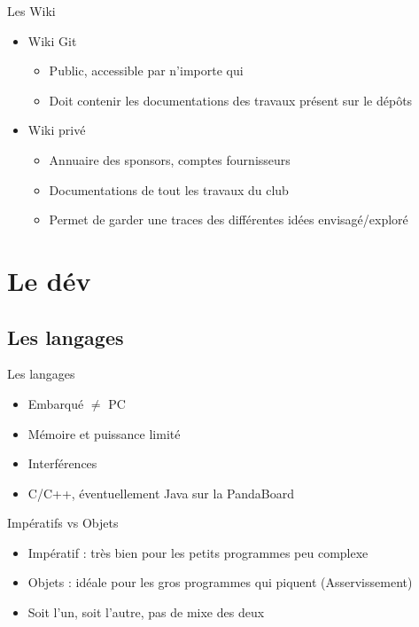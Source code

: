 \documentclass{beamer}
\begin{document}
\begin{frame}{Les Wiki}
	\begin{itemize}
		\item Wiki Git
			\begin{itemize}
				\item Public, accessible par n'importe qui
				\item Doit contenir les documentations des travaux présent sur le dépôts
			\end{itemize}
		\item Wiki privé
			\begin{itemize}
				\item Annuaire des sponsors, comptes fournisseurs
				\item Documentations de tout les travaux du club
				\item Permet de garder une traces des différentes idées envisagé/exploré
			\end{itemize}
	\end{itemize}
\end{frame}

\section{Le dév}
\subsection{Les langages}
\begin{frame}{Les langages}
	\begin{itemize}
		\item Embarqué $\neq$ PC
		\item Mémoire et puissance limité
		\item Interférences
		\item C/C++, éventuellement Java sur la PandaBoard
	\end{itemize}
\end{frame}

\begin{frame}{Impératifs vs Objets}
	\begin{itemize}
		\item Impératif : très bien pour les petits programmes peu complexe
		\item Objets : idéale pour les gros programmes qui piquent (Asservissement)
		\item Soit l'un, soit l'autre, pas de mixe des deux
	\end{itemize}
\end{frame}
\end{document}
